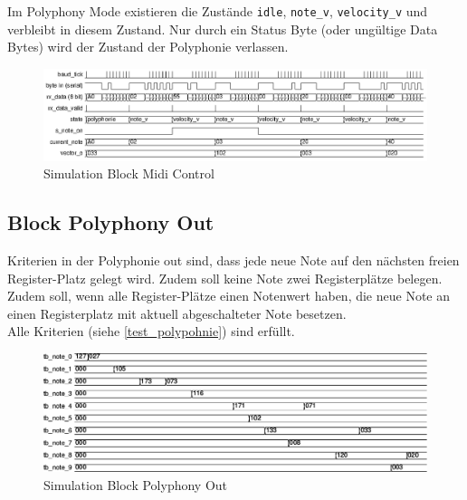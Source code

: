 Im Polyphony Mode existieren die Zustände \lstinline|idle|, \lstinline|note_v|, \lstinline|velocity_v| und verbleibt in diesem Zustand. Nur durch ein Status Byte (oder ungültige Data Bytes) wird der Zustand der Polyphonie verlassen.

\begin{figure}[H]
	\includegraphics[width=1\textwidth]{images/midi_control/wave_polyphonie.png}
	\caption{Simulation Block Midi Control}
	\label{fig.test_midi:control}
\end{figure} 

\subsection{Block Polyphony Out}

Kriterien in der Polyphonie out sind, dass jede neue Note auf den nächsten freien Register-Platz gelegt wird. Zudem soll keine Note zwei Registerplätze belegen. Zudem soll, wenn alle Register-Plätze einen Notenwert haben, die neue Note an einen Registerplatz mit aktuell abgeschalteter Note besetzen.\\
Alle Kriterien (siehe \ref {test_polypohnie}) sind erfüllt.

\begin{figure}[H]
	\includegraphics[width=1\textwidth]{images/midi_interface/tb_polyphonie.png}
	\caption{Simulation Block Polyphony Out}
	\label{fig.test_polyphonie}
\end{figure} 
